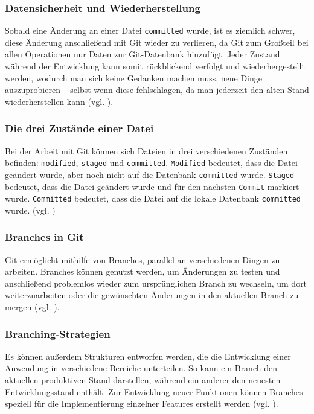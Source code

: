\documentclass[oneside]{ausarbeitung}
\begin{document}
\subsubsection{Datensicherheit und Wiederherstellung}
Sobald eine Änderung an einer Datei \texttt{committed} wurde, ist es ziemlich schwer, diese Änderung anschließend mit Git wieder zu verlieren, da Git zum Großteil bei allen Operationen nur Daten zur Git-Datenbank hinzufügt. Jeder Zustand während der Entwicklung kann somit rückblickend verfolgt und wiederhergestellt werden, wodurch man sich keine Gedanken machen muss, neue Dinge auszuprobieren – selbst wenn diese fehlschlagen, da man jederzeit den alten Stand wiederherstellen kann (vgl. \parencite{git_intro}).  

\subsubsection{Die drei Zustände einer Datei}
Bei der Arbeit mit Git können sich Dateien in drei verschiedenen Zuständen befinden: \texttt{modified}, \texttt{staged} und \texttt{committed}.  
\texttt{Modified} bedeutet, dass die Datei geändert wurde, aber noch nicht auf die Datenbank \texttt{committed} wurde.  
\texttt{Staged} bedeutet, dass die Datei geändert wurde und für den nächsten \texttt{Commit} markiert wurde.  
\texttt{Committed} bedeutet, dass die Datei auf die lokale Datenbank \texttt{committed} wurde. (vgl. \parencite{git_intro})

\subsubsection{Branches in Git}
Git ermöglicht mithilfe von Branches, parallel an verschiedenen Dingen zu arbeiten. Branches können genutzt werden, um Änderungen zu testen und anschließend problemlos wieder zum ursprünglichen Branch zu wechseln, um dort weiterzuarbeiten oder die gewünschten Änderungen in den aktuellen Branch zu mergen (vgl. \parencite{git-branching-merging}).  

\subsubsection{Branching-Strategien}
Es können außerdem Strukturen entworfen werden, die die Entwicklung einer Anwendung in verschiedene Bereiche unterteilen. So kann ein Branch den aktuellen produktiven Stand darstellen, während ein anderer den neuesten Entwicklungsstand enthält. Zur Entwicklung neuer Funktionen können Branches speziell für die Implementierung einzelner Features erstellt werden (vgl. \parencite{git-branching-merging}).
\end{document}

